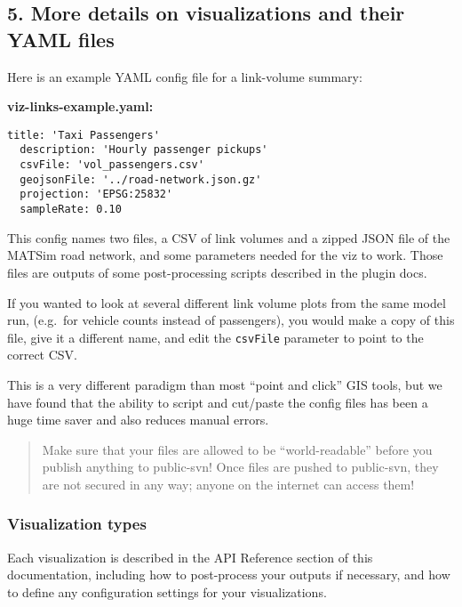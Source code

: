 \hypertarget{more-details-on-visualizations-and-their-yaml-files}{%
\subsection{5. More details on visualizations and their YAML
files}\label{more-details-on-visualizations-and-their-yaml-files}}

Here is an example YAML config file for a link-volume summary:

\textbf{viz-links-example.yaml:}

\begin{lstlisting}[]
  title: 'Taxi Passengers'
  description: 'Hourly passenger pickups'
  csvFile: 'vol_passengers.csv'
  geojsonFile: '../road-network.json.gz'
  projection: 'EPSG:25832'
  sampleRate: 0.10
\end{lstlisting}

This config names two files, a CSV of link volumes and a zipped JSON
file of the MATSim road network, and some parameters needed for the viz
to work. Those files are outputs of some post-processing scripts
described in the plugin docs.

If you wanted to look at several different link volume plots from the
same model run, (e.g.~for vehicle counts instead of passengers), you
would make a copy of this file, give it a different name, and edit the
\texttt{csvFile} parameter to point to the correct CSV.

This is a very different paradigm than most ``point and click'' GIS
tools, but we have found that the ability to script and cut/paste the
config files has been a huge time saver and also reduces manual errors.

\begin{quote}
Make sure that your files are allowed to be ``world-readable'' before
you publish anything to public-svn! Once files are pushed to public-svn,
they are not secured in any way; anyone on the internet can access them!
\end{quote}

\hypertarget{visualization-types}{%
\subsubsection{Visualization types}\label{visualization-types}}

Each visualization is described in the API Reference section of this
documentation, including how to post-process your outputs if necessary,
and how to define any configuration settings for your visualizations.
